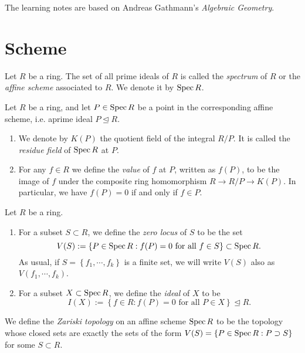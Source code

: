 \thispagestyle{empty}
The learning notes are based on Andreas Gathmann's \textit{Algebraic Geometry}.
\tableofcontents
\section{Scheme}
\begin{definition}
  Let  $R$ be a ring. The set of all prime ideals of $R$ is called the \textit{spectrum} of $R$ or the \textit{affine scheme} associated to $R$. We denote it by $\operatorname{Spec} R$.	
\end{definition}
\begin{definition}
  Let $R$ be a ring, and let $P\in \operatorname{Spec} R$ be a point in the corresponding affine scheme, i.e. aprime ideal $P\unlhd R$.
  \begin{enumerate}
    \item We denote by $K(P)$ the quotient field of the integral $R /P$. It is called the \textit{residue field} of $\operatorname{Spec} R$ at $P$.
    \item For any $f\in R$ we define the \textit{value} of $f$ at $P$, written as $f(P)$, to be the image of $f$ under the composite ring homomorphism $R\to R /P\to K(P)$. In particular, we have $f(P)=0$ if and only if $f\in P$.
  \end{enumerate}
\end{definition}
\begin{definition}
  Let $R$ be a ring.
  \begin{enumerate}
    \item For a subset $S\subset R$, we define the \textit{zero locus} of $S$ to be the set 
      \[
	V(S):=\left\{P \in \operatorname{Spec} R: f(P)=0 \text{ for all }f\in S\right\} \subset \operatorname{Spec} R.
      \] As usual, if $S=\left\{f_1,\cdots ,f_k\right\} $ is a finite set, we will write $V(S)$ also as $V(f_1,\cdots ,f_k)$.
    \item For a subset $X\subset \operatorname{Spec} R$, we define the \textit{ideal} of $X$ to be 
      \[
	I(X):=\left\{f\in R:f(P)=0 \text{ for all }P \in X\right\} \unlhd R.
      \] 
  \end{enumerate}
\end{definition}
\begin{definition}
  We define the  \textit{Zariski topology} on an affine scheme $\operatorname{Spec} R$ to be the topology whose closed sets are exactly the sets of the form $V(S)=\left\{P\in \operatorname{Spec} R:P\supset S\right\} $ for some $S\subset R$.
\end{definition}
